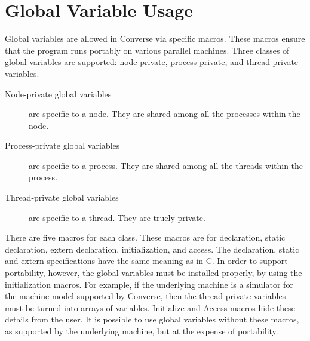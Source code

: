 %
%
%
%
%
%
%

\chapter{Global Variable Usage}


Global variables are allowed in Converse via specific macros.  These macros 
ensure that the program runs portably on various parallel machines. 
Three classes of global variables are supported: node-private,
process-private, and thread-private variables. 

\begin{description}
\item[Node-private global variables] are specific to a node. They are
     shared among all the processes within the node.
\item[Process-private global variables]  are specific to a process. They are
     shared among all the threads within the process.
\item[Thread-private global variables] are specific to a thread. They are 
     truely private.
\end{description}

There are five macros for each class. These macros are for
declaration, static declaration, extern declaration, initialization, and
access. The declaration, static and extern specifications have the same
meaning as in C. In order to support portability, however, the global
variables must be installed properly, by using the initialization macros.
For example, if the underlying machine is a simulator for the machine model 
supported by Converse, then the thread-private variables must be turned into 
arrays of variables.  Initialize and Access macros hide these details from 
the user.  It is possible to use global variables without these macros, 
as supported by the underlying machine, but at the expense of portability.



